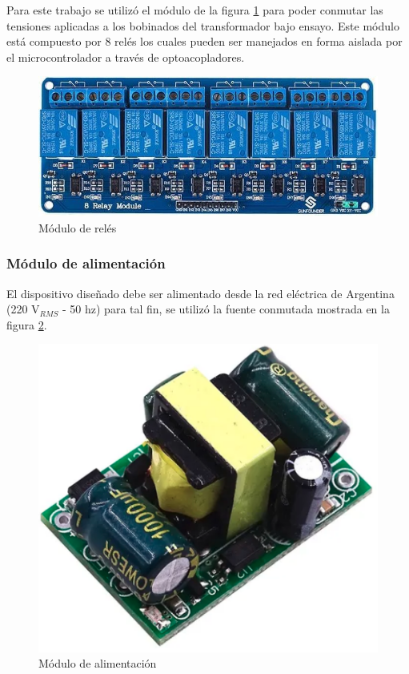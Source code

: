 Para este trabajo se utilizó el módulo de la figura \ref{fig:reles} para poder conmutar las tensiones aplicadas a los bobinados del transformador bajo ensayo. Este módulo está compuesto por 8 relés los cuales pueden ser manejados en forma aislada por el microcontrolador a través de optoacopladores. 

\begin{figure}[htpb]
	\centering
	\includegraphics[scale=0.7]{./Figures/reles.jpeg}
	\caption{Módulo de relés}
	\label{fig:reles}
\end{figure}

\subsubsection{Módulo de alimentación}

El dispositivo diseñado debe ser alimentado desde la red eléctrica de Argentina (220 V$_{RMS}$ - 50 hz) para tal fin, se utilizó la fuente conmutada mostrada en la figura \ref{fig:fte}.

\begin{figure}[htpb]
	\centering
	\includegraphics[scale=0.6]{./Figures/fte.png}
	\caption{Módulo de alimentación}
	\label{fig:fte}
\end{figure}

